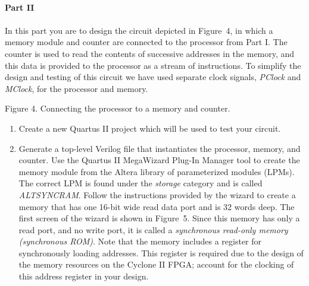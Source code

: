 \documentclass[epsfig,10pt,fullpage]{article}
\begin{document}
~\\
\noindent
{\bf Part II}
~\\
~\\
\noindent
In this part you are to design the circuit depicted in Figure~4, in which a 
memory module and counter are connected to the processor from Part I. The
counter is used to read the contents of successive addresses in the memory, and
this data is provided to the processor as a stream of instructions. To simplify the
design and testing of this circuit we have used separate clock signals, {\it PClock} 
and {\it MClock}, for the processor and memory.
\begin{figure}[H]
\scriptsize
\centerline{
\hbox{}}
\end{figure}
\centerline{Figure 4. Connecting the processor to a memory and counter.}
\begin{enumerate}
\item Create a new Quartus II project which will be used to test your circuit.
\item Generate a top-level Verilog file that instantiates the processor, memory, and
counter. Use the Quartus II MegaWizard Plug-In Manager tool to create the memory 
module from the Altera library of parameterized modules (LPMs). The correct
LPM is found under the {\it storage} category and is called {\it ALTSYNCRAM}. Follow the
instructions provided by the wizard to create a memory that has one 16-bit wide read data port
and is 32 words deep. The first screen of the wizard is shown in Figure~5. Since
this memory has only a read port, and no write port, it is called a 
{\it synchronous read-only memory (synchronous ROM)}. 
Note that the memory includes a register for synchronously loading addresses. This 
register is required
due to the design of the memory resources on the Cyclone II FPGA; account for
the clocking of this address register in your design.


\end{enumerate}
\end{document}
